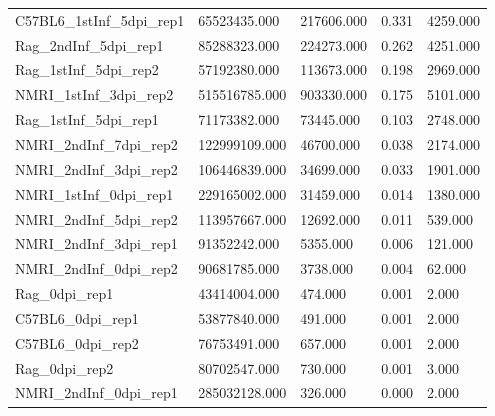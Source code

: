 \documentclass{article}
\begin{document}
\begin{table}[H]
\begin{tabular}{*5l}
C57BL6\_1stInf\_5dpi\_rep1 & 65523435.000 & 217606.000 & 0.331 & 4259.000 \\ 
Rag\_2ndInf\_5dpi\_rep1 & 85288323.000 & 224273.000 & 0.262 & 4251.000 \\ 
Rag\_1stInf\_5dpi\_rep2 & 57192380.000 & 113673.000 & 0.198 & 2969.000 \\ 
NMRI\_1stInf\_3dpi\_rep2 & 515516785.000 & 903330.000 & 0.175 & 5101.000 \\ 
Rag\_1stInf\_5dpi\_rep1 & 71173382.000 & 73445.000 & 0.103 & 2748.000 \\ 
NMRI\_2ndInf\_7dpi\_rep2 & 122999109.000 & 46700.000 & 0.038 & 2174.000 \\ 
NMRI\_2ndInf\_3dpi\_rep2 & 106446839.000 & 34699.000 & 0.033 & 1901.000 \\ 
	 {\color{Gray}NMRI\_1stInf\_0dpi\_rep1} &  {\color{Gray}229165002.000} & {\color{Gray} 31459.000} &  {\color{Gray}0.014} & {\color{Gray} 1380.000} \\ 
NMRI\_2ndInf\_5dpi\_rep2 & 113957667.000 & 12692.000 & 0.011 & 539.000 \\ 
NMRI\_2ndInf\_3dpi\_rep1 & 91352242.000 & 5355.000 & 0.006 & 121.000 \\ 
NMRI\_2ndInf\_0dpi\_rep2 & 90681785.000 & 3738.000 & 0.004 & 62.000 \\ 
Rag\_0dpi\_rep1 & 43414004.000 & 474.000 & 0.001 & 2.000 \\ 
C57BL6\_0dpi\_rep1 & 53877840.000 & 491.000 & 0.001 & 2.000 \\ 
C57BL6\_0dpi\_rep2 & 76753491.000 & 657.000 & 0.001 & 2.000 \\ 
Rag\_0dpi\_rep2 & 80702547.000 & 730.000 & 0.001 & 3.000 \\ 
NMRI\_2ndInf\_0dpi\_rep1 & 285032128.000 & 326.000 & 0.000 & 2.000 \\ 
\bottomrule
\hline
\end{tabular}
\end{table}




\end{document}
